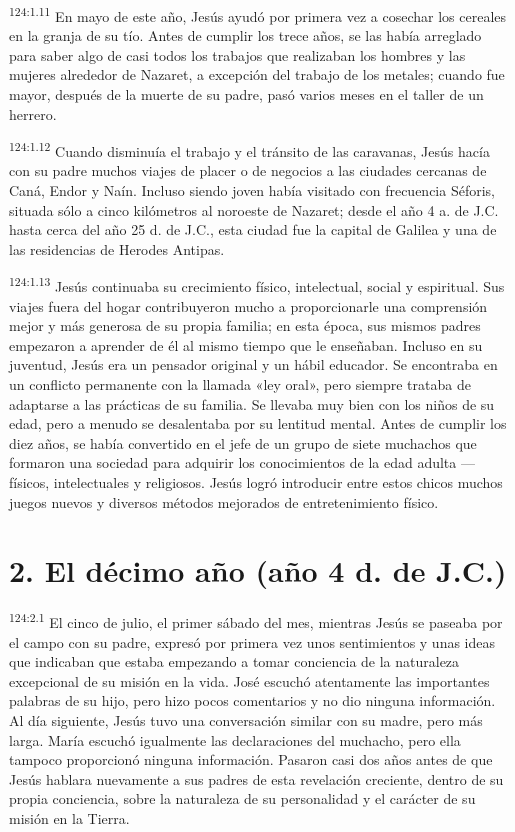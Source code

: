 \par
\textsuperscript{124:1.11} En mayo de este año, Jesús ayudó por primera vez a cosechar los cereales en la granja de su tío. Antes de cumplir los trece años, se las había arreglado para saber algo de casi todos los trabajos que realizaban los hombres y las mujeres alrededor de Nazaret, a excepción del trabajo de los metales; cuando fue mayor, después de la muerte de su padre, pasó varios meses en el taller de un herrero.

\par
\textsuperscript{124:1.12} Cuando disminuía el trabajo y el tránsito de las caravanas, Jesús hacía con su padre muchos viajes de placer o de negocios a las ciudades cercanas de Caná, Endor y Naín. Incluso siendo joven había visitado con frecuencia Séforis, situada sólo a cinco kilómetros al noroeste de Nazaret; desde el año 4 a. de J.C. hasta cerca del año 25 d. de J.C., esta ciudad fue la capital de Galilea y una de las residencias de Herodes Antipas.

\par
\textsuperscript{124:1.13} Jesús continuaba su crecimiento físico, intelectual, social y espiritual. Sus viajes fuera del hogar contribuyeron mucho a proporcionarle una comprensión mejor y más generosa de su propia familia; en esta época, sus mismos padres empezaron a aprender de él al mismo tiempo que le enseñaban. Incluso en su juventud, Jesús era un pensador original y un hábil educador. Se encontraba en un conflicto permanente con la llamada «ley oral», pero siempre trataba de adaptarse a las prácticas de su familia. Se llevaba muy bien con los niños de su edad, pero a menudo se desalentaba por su lentitud mental. Antes de cumplir los diez años, se había convertido en el jefe de un grupo de siete muchachos que formaron una sociedad para adquirir los conocimientos de la edad adulta ---físicos, intelectuales y religiosos. Jesús logró introducir entre estos chicos muchos juegos nuevos y diversos métodos mejorados de entretenimiento físico.

\section*{2. El décimo año (año 4 d. de J.C.)}
\par
\textsuperscript{124:2.1} El cinco de julio, el primer sábado del mes, mientras Jesús se paseaba por el campo con su padre, expresó por primera vez unos sentimientos y unas ideas que indicaban que estaba empezando a tomar conciencia de la naturaleza excepcional de su misión en la vida. José escuchó atentamente las importantes palabras de su hijo, pero hizo pocos comentarios y no dio ninguna información. Al día siguiente, Jesús tuvo una conversación similar con su madre, pero más larga. María escuchó igualmente las declaraciones del muchacho, pero ella tampoco proporcionó ninguna información. Pasaron casi dos años antes de que Jesús hablara nuevamente a sus padres de esta revelación creciente, dentro de su propia conciencia, sobre la naturaleza de su personalidad y el carácter de su misión en la Tierra.

